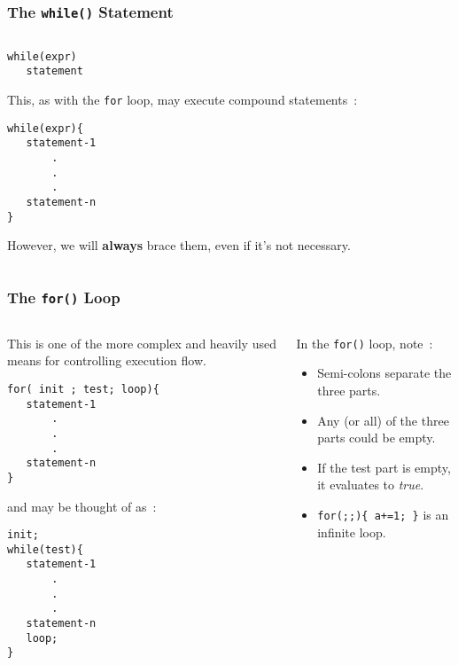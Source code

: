 \begin{frame}[fragile]
\frametitle{The {\tt while()} Statement}
\begin{columns}

\begin{column}{0.45\textwidth}
\begin{lstlisting}[style=basicc,numbers=none]
while(expr)
   statement
\end{lstlisting}

This, as with the {\tt for} loop, may execute compound statements~:

\begin{lstlisting}[style=basicc,numbers=none]
while(expr){
   statement-1
       .
       .
       .
   statement-n
}
\end{lstlisting}
However, we will {\bf always} brace them, even if it's not necessary.
\end{column}

\pause
\begin{column}{0.45\textwidth}

\end{column}

\end{columns}
\end{frame}

\begin{frame}[fragile]
\frametitle{The {\tt for()} Loop}
\begin{columns}

\begin{column}{0.45\textwidth}
This is one of the more complex and heavily used means
for controlling execution flow.

\begin{lstlisting}[style=basicc,numbers=none]
for( init ; test; loop){
   statement-1
       .
       .
       .
   statement-n
}
\end{lstlisting}

and may be thought of as~:
\begin{lstlisting}[style=basicc,numbers=none]
init;
while(test){
   statement-1
       .
       .
       .
   statement-n
   loop;
}
\end{lstlisting}
\end{column}

\pause
\begin{column}{0.45\textwidth}
In the \verb^for()^ loop, note~:
\begin{itemize}[<+->]
\item Semi-colons separate the three parts.
\item Any (or all) of the three parts could be empty.
\item If the test part is empty, it evaluates to {\it true}.
\item \verb^for(;;){ a+=1; }^  is an infinite loop.
\end{itemize}
\end{column}

\end{columns}
\end{frame}

